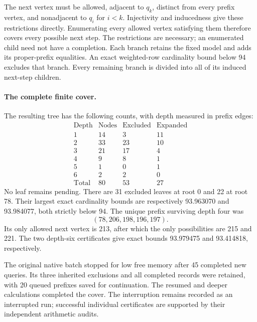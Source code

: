 \documentclass[11pt,a4paper]{article}
\theoremstyle{definition}
\theoremstyle{remark}
\begin{document}
The next vertex must be allowed, adjacent to $q_k$, distinct from every
prefix vertex, and nonadjacent to $q_i$ for $i<k$. Injectivity and
inducedness give these restrictions directly. Enumerating every allowed
vertex satisfying them therefore covers every possible next step.
The restrictions are necessary; an enumerated child need not have a completion.
Each branch retains the fixed model and adds its proper-prefix equalities.
An exact weighted-row cardinality bound below 94 excludes that branch.
Every remaining branch is divided into all of its induced next-step children.

\paragraph{The complete finite cover.}
The resulting tree has the following counts, with depth measured in prefix edges:
\[
\begin{array}{c|r|r|r}
\text{Depth}&\text{Nodes}&\text{Excluded}&\text{Expanded}\\\hline
1&14&3&11\\
2&33&23&10\\
3&21&17&4\\
4&9&8&1\\
5&1&0&1\\
6&2&2&0\\\hline
\text{Total}&80&53&27
\end{array}
\]
No leaf remains pending. There are 31 excluded leaves at root 0 and 22
at root 78. Their largest exact cardinality bounds are respectively
93.963070 and 93.984077, both strictly below 94.
The unique prefix surviving depth four was
\[
(78,206,198,196,197).
\]
Its only allowed next vertex is 213, after which the only possibilities
are 215 and 221. The two depth-six certificates give exact bounds
93.979475 and 93.414818, respectively.

The original native batch stopped for low free memory after 45 completed
new queries. Its three inherited exclusions and all completed records
were retained, with 20 queued prefixes saved for continuation. The resumed
and deeper calculations completed the cover. The interruption remains
recorded as an interrupted run; successful individual certificates are
supported by their independent arithmetic audits.
\end{document}
